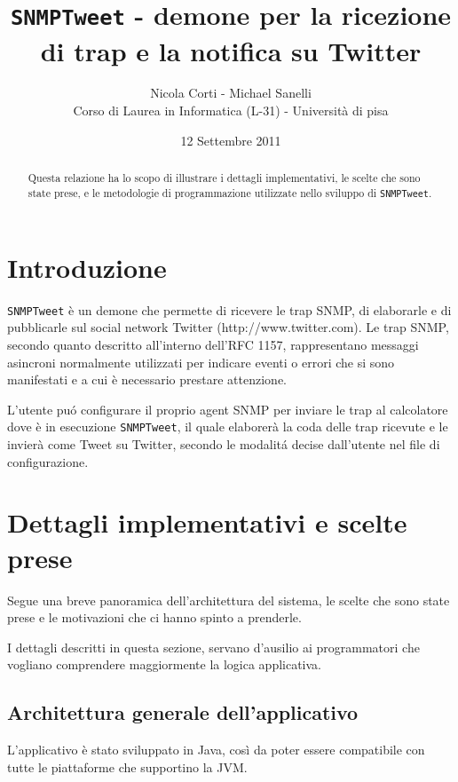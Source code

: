 \documentclass[a4paper, 10pt]{article}
\title{\texttt{SNMPTweet} - demone per la ricezione di trap e la notifica su
Twitter}
\author{Nicola Corti - Michael Sanelli \\Corso di Laurea in Informatica
(L-31) - Universit\`a di pisa}
\date{12 Settembre 2011}
\begin{document}
\maketitle

\begin{abstract}
Questa relazione ha lo scopo di illustrare i dettagli implementativi, le scelte
che sono state prese, e le metodologie di programmazione utilizzate nello
sviluppo di \texttt{SNMPTweet}.
\end{abstract}

\tableofcontents

\newpage

\section{Introduzione}
\texttt{SNMPTweet} \`e un demone che permette di ricevere le trap SNMP, di elaborarle e di pubblicarle sul social network Twitter (http://www.twitter.com).
Le trap SNMP, secondo quanto descritto all'interno dell'RFC 1157, rappresentano messaggi asincroni normalmente utilizzati per indicare eventi o errori che si sono manifestati e a cui \`e necessario prestare attenzione.

L'utente pu\'o configurare il proprio agent SNMP per inviare le trap al calcolatore dove \`e in esecuzione \texttt{SNMPTweet}, il quale elaborer\`a la coda delle trap ricevute e le invier\`a come Tweet su Twitter, secondo le modalit\'a decise dall'utente nel file di configurazione.

\section{Dettagli implementativi e scelte prese}

Segue una breve panoramica dell'architettura del sistema, le scelte che sono state prese e le motivazioni che ci hanno spinto a prenderle.

I dettagli descritti in questa sezione, servano d'ausilio ai programmatori che vogliano comprendere maggiormente la logica applicativa.

\subsection{Architettura generale dell'applicativo}

L'applicativo \`e stato sviluppato in Java, cos\`i da poter essere compatibile con tutte le piattaforme che supportino la JVM.
\end{document}
